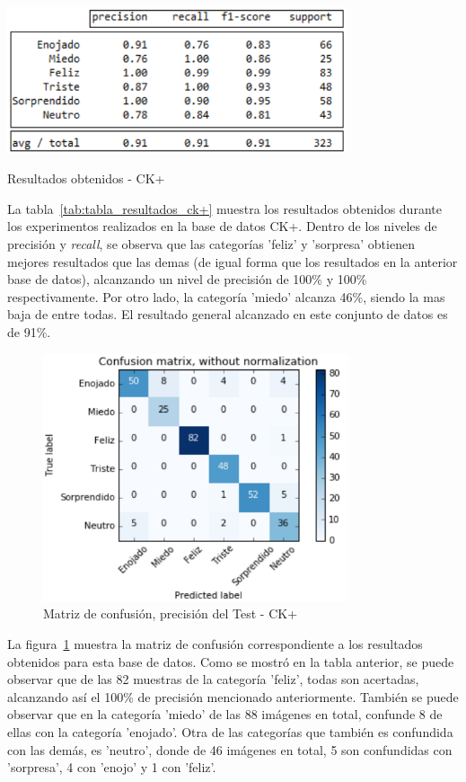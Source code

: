 \begin{table}[H]
    \centering
    \includegraphics[width=100mm]{Imagenes/tabla_resultados_ck+.png} 
    \caption{Resultados obtenidos - CK+}
    \label{tab:tabla_resultados_ck+}
\end{table}

La tabla~\ref{tab:tabla_resultados_ck+} muestra los resultados obtenidos durante los experimentos realizados en la base de datos CK+. Dentro de los niveles de precisión y \textit{recall}, se observa que las categorías 'feliz' y 'sorpresa' obtienen mejores resultados que las demas (de igual forma que los resultados en la anterior base de datos), alcanzando un nivel de precisión de 100\% y 100\% respectivamente. Por otro lado, la categoría 'miedo' alcanza 46\%, siendo la mas baja de entre todas. El resultado general alcanzado en este conjunto de datos es de 91\%.

\begin{figure}[H]
		\centering
		\includegraphics[width=90mm]{Imagenes/matriz_confusion_ck+.png}
		\caption{Matriz de confusión, precisión del Test - CK+}
		\label{fig:matriz_confusion_ck+}
\end{figure}

La figura~\ref{fig:matriz_confusion_ck+} muestra la matriz de confusión correspondiente a los resultados obtenidos para esta base de datos. Como se mostró en la tabla anterior, se puede observar que de las 82 muestras de la categoría 'feliz', todas son acertadas, alcanzando así el 100\% de precisión mencionado anteriormente. También se puede observar que en la categoría 'miedo' de las 88 imágenes en total, confunde 8 de ellas con la categoría 'enojado'. Otra de las categorías que también es confundida con las demás, es 'neutro', donde de 46 imágenes en total, 5 son confundidas con 'sorpresa', 4 con 'enojo' y 1 con 'feliz'.
 
